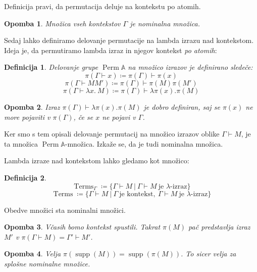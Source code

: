 \documentclass{article}
\DeclareMathOperator{\Perm}{Perm}
\DeclareMathOperator{\supp}{supp}
\DeclareMathOperator{\Terms}{Terms}
\newtheorem{opomba}{Opomba}
\newtheorem{definicija}{Definicija}
\begin{document}
Definicija pravi, da permutacija deluje na kontekstu po atomih.

\begin{opomba}
    Množica vseh kontekstov \(\Gamma\) je nominalna množica.
\end{opomba}


Sedaj lahko definiramo delovanje permutacije na lambda izrazu nad kontekstom. Ideja je, da permutiramo lambda izraz in njegov kontekst \emph{po atomih}:

\begin{definicija}
    Delovanje grupe \(\Perm{\mathds{A}}\) na množico izrazov je definirano sledeče:
    \[
        \pi(\Gamma \vdash x) \coloneq \pi(\Gamma) \vdash \pi(x)
    \]
    \[
        \pi(\Gamma \vdash MM') \coloneq \pi(\Gamma ) \vdash \pi(M)\pi(M')
    \]
    \[
        \pi(\Gamma \vdash \lambda x.\ M) \coloneq \pi(\Gamma) \vdash \lambda \pi(x). \pi(M)
    \]
\end{definicija}

\begin{opomba}
    Izraz \(\pi(\Gamma) \vdash \lambda \pi(x). \pi(M)\) je dobro definiran, saj se \(\pi(x)\) ne more pojaviti v \(\pi(\Gamma)\), če se \(x\) ne pojavi v \(\Gamma\).
\end{opomba}

Ker smo s tem opisali delovanje permutacij na množico izrazov oblike \(\Gamma \vdash M\), je ta množica \(\Perm{\mathds{A}}\)-množica. Izkaže se, da je tudi nominalna množica.

Lambda izraze nad kontekstom lahko gledamo kot množico:
\begin{definicija}
    \[
        \Terms_{\Gamma} \coloneq \{\Gamma \vdash M\ |\ \Gamma \vdash M \ \text{je \(\lambda\)-izraz}\}
    \]
    \[
        \Terms \coloneq \{\Gamma \vdash M\ |\ \Gamma\ \text{je kontekst},\ \Gamma \vdash M \ \text{je \(\lambda\)-izraz}\}
    \]
\end{definicija}

Obedve množici sta nominalni množici.

\begin{opomba}
    Včasih bomo kontekst spustili. Takrat \(\pi(M)\) pač predstavlja izraz \(M'\) v \(\pi(\Gamma \vdash M) = \Gamma' \vdash M'\).
\end{opomba}

\begin{opomba}
    Velja \(\pi(\supp(M)) = \supp(\pi(M))\). To sicer velja za splošne nominalne množice.
\end{opomba}
\end{document}
